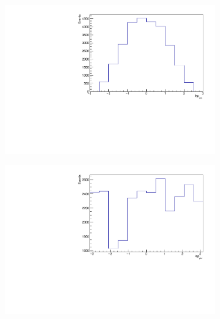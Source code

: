 \begin{figure}[H]
  \begin{subfigure}{0.5\textwidth}
    \centering
    \includegraphics[width=\linewidth]{plots_and_txt/ttbar.mu_selected_/ttbar.mu_selected_lep_eta.pdf}
    \caption{}
    \label{fig:lep_pt2}
  \end{subfigure}%
  \begin{subfigure}{0.5\textwidth}
    \centering
    \includegraphics[width=\linewidth]{plots_and_txt/ttbar.mu_selected_/ttbar.mu_selected_lep_phi.pdf}
    \caption{}
    \label{fig:btagged2}
  \end{subfigure}%
  \newline
  \begin{subfigure}{0.5\textwidth}
    \centering

\end{subfigure}
\end{figure}
